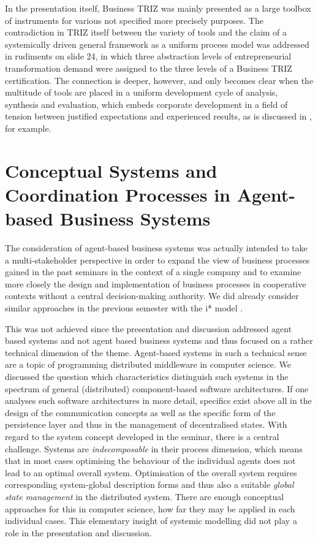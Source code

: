 \documentclass[11pt,a4paper]{article}
\begin{document}
In the presentation itself, Business TRIZ was mainly presented as a large
toolbox of instruments for various not specified more precisely purposes. The
contradiction in TRIZ itself between the variety of tools and the claim of a
systemically driven general framework as a uniform process model was addressed
in rudiments on slide 24, in which three abstraction levels of entrepreneurial
transformation demand were assigned to the three levels of a Business TRIZ
certification. The connection is deeper, however, and only becomes clear when
the multitude of tools are placed in a uniform development cycle of analysis,
synthesis and evaluation, which embeds corporate development in a field of
tension between justified expectations and experienced results, as is
discussed in \cite{Ackoff1997}, for example.

\section{Conceptual Systems and Coordination Processes in Agent-based
  Business Systems}

The consideration of agent-based business systems was actually intended to
take a multi-stakeholder perspective in order to expand the view of business
processes gained in the past seminars in the context of a single company and
to examine more closely the design and implementation of business processes in
cooperative contexts without a central decision-making authority. We did
already consider similar approaches in the previous semester with the i* model
\cite{Notes-S21}.

This was not achieved since the presentation and discussion addressed agent
based systems and not agent based business systems and thus focused on a
rather technical dimension of the theme. Agent-based systems in such a
technical sense are a topic of programming distributed middleware in computer
science.  We discussed the question which characteristics distinguish such
systems in the spectrum of general (distributed) component-based software
architectures. If one analyses such software architectures in more detail,
specifics exist above all in the design of the communication concepts as well
as the specific form of the persistence layer and thus in the management of
decentralised states. With regard to the system concept developed in the
seminar, there is a central challenge. Systems are \emph{indecomposable} in
their process dimension, which means that in most cases optimising the
behaviour of the individual agents does not lead to an optimal overall system.
Optimisation of the overall system requires corresponding system-global
description forms and thus also a suitable \emph{global state management} in
the distributed system. There are enough conceptual approaches for this in
computer science, how far they may be applied in each individual cases. This
elementary insight of systemic modelling did not play a role in the
presentation and discussion.
\end{document}
